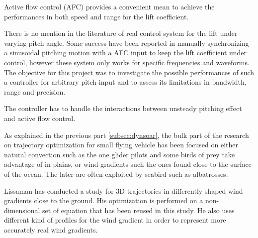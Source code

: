 \par Active flow control (AFC) provides a convenient mean to achieve the performances in both speed and range for the lift coefficient. 

\par There is no mention in the literature of real control system for the lift under varying pitch angle.
Some success have been reported in manually synchronizing a sinusoidal pitching motion with a AFC input to keep the lift coefficient under control, however these system only works for specific frequencies and waveforms. 
The objective for this project was to investigate the possible performances of such a controller for arbitrary pitch input and to assess its limitations in bandwidth, range and precision.

\par The controller has to handle the interactions between unsteady pitching effect and active flow control.



\par As explained in the previous part \ref{subsec:dynsoar}, the bulk part of the research on trajectory optimization for small flying vehicle has been focused on either natural convection such as the one glider pilots and some birds of prey take advantage of in plains, or wind gradients such the ones found close to the surface of the ocean.
The later are often exploited by seabird such as albatrosses.

\par Lissaman \cite{lissaman2005wind} has conducted a study for 3D trajectories in differently shaped wind gradients close to the ground.
His optimization is performed on a non-dimensional set of equation that has been reused in this study.
He also uses different kind of profiles for the wind gradient in order to represent more accurately real wind gradients.

